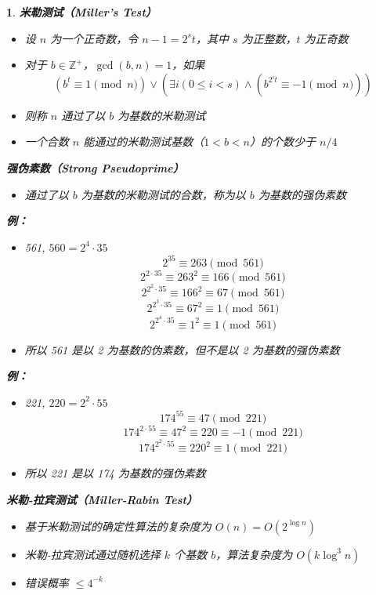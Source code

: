 \documentclass[UTF8]{report}
\theoremstyle{MyLineTheoremStyle} %
\theoremstyle{MyBlockTheoremStyle} %
\theoremstyle{MySubsubsectionStyle} %
\newtheorem{definition}{}
\begin{document}
\begin{definition}
    \textbf{米勒测试（Miller’s Test）}
    \begin{itemize}
        \item 设 $n$ 为一个正奇数，令 $n - 1 = 2^s t$，其中 $s$ 为正整数，$t$ 为正奇数
        \item 对于 $b \in \mathbb{Z}^+$，$\gcd(b, n) = 1$，如果
        \[
            \left(b^t \equiv 1 \pmod{n}\right) \vee \left(\exists i \left(0 \leq i < s\right) \wedge \left(b^{2^i t} \equiv -1 \pmod{n}\right)\right)
        \]
        \item 则称 $n$ 通过了以 $b$ 为基数的米勒测试
        \item 一个合数 $n$ 能通过的米勒测试基数（$1 < b < n$）的个数少于 $n/4$
    \end{itemize}

    \textbf{强伪素数（Strong Pseudoprime）}
    \begin{itemize}
        \item 通过了以 $b$ 为基数的米勒测试的合数，称为以 $b$ 为基数的强伪素数
    \end{itemize}

    \textbf{例：}
    \begin{itemize}
        \item 561, $560 = 2^4 \cdot 35$
        \[
        2^{35} \equiv 263 \pmod{561}
        \]
        \[
        2^{2 \cdot 35} \equiv 263^2 \equiv 166 \pmod{561}
        \]
        \[
        2^{2^2 \cdot 35} \equiv 166^2 \equiv 67 \pmod{561}
        \]
        \[
        2^{2^3 \cdot 35} \equiv 67^2 \equiv 1 \pmod{561}
        \]
        \[
        2^{2^4 \cdot 35} \equiv 1^2 \equiv 1 \pmod{561}
        \]
        \item 所以 561 是以 2 为基数的伪素数，但不是以 2 为基数的强伪素数
    \end{itemize}

    \textbf{例：}
    \begin{itemize}
        \item 221, $220 = 2^2 \cdot 55$
        \[
        174^{55} \equiv 47 \pmod{221}
        \]
        \[
        174^{2 \cdot 55} \equiv 47^2 \equiv 220 \equiv -1 \pmod{221}
        \]
        \[
        174^{2^2 \cdot 55} \equiv 220^2 \equiv 1 \pmod{221}
        \]
        \item 所以 221 是以 174 为基数的强伪素数
    \end{itemize}

    \textbf{米勒-拉宾测试（Miller-Rabin Test）}
    \begin{itemize}
        \item 基于米勒测试的确定性算法的复杂度为 $O(n) = O(2^{\log n})$
        \item 米勒-拉宾测试通过随机选择 $k$ 个基数 $b$，算法复杂度为 $O(k \log^3 n)$
        \item 错误概率 $\leq 4^{-k}$
    \end{itemize}


\end{definition}
\end{document}
